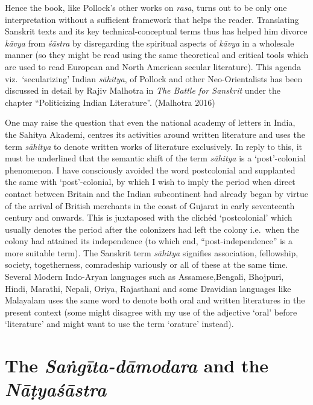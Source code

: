 Hence the book, like Pollock’s other works on \textsl{rasa}, turns out to be only one interpretation without a sufficient framework that helps the reader. Translating Sanskrit texts and its key technical-conceptual terms thus has helped him divorce \textsl{kāvya} from \textsl{śāstra} by disregarding the spiritual aspects of \textsl{kāvya} in a wholesale manner (so they might be read using the same theoretical and critical tools which are used to read European and North American secular literature). This agenda viz.~‘secularizing’ Indian \textsl{sāhitya}, of Pollock and other Neo-Orientalists has been discussed in detail by Rajiv Malhotra in \textsl{The Battle for Sanskrit} under the chapter “Politicizing Indian Literature”. (Malhotra 2016) 

One may raise the question that even the national academy of letters in India, the Sahitya Akademi, centres its activities around written literature and uses the term \textsl{sāhitya} to denote written works of literature exclusively. In reply to this, it must be underlined that the semantic shift of the term \textsl{sāhitya} is a ‘post’-colonial phenomenon. I have consciously avoided the word postcolonial and supplanted the same with ‘post’-colonial, by which I wish to imply the period when direct contact between Britain and the Indian subcontinent had already began by virtue of the arrival of British merchants in the coast of Gujarat in early seventeenth century and onwards. This is juxtaposed with the clichéd ‘postcolonial’ which usually denotes the period after the colonizers had left the colony i.e.~when the colony had attained its independence (to which end, ``post-independence'' is a more suitable term). The Sanskrit term \textsl{sāhitya} signifies association, fellowship, society, togetherness, comradeship variously or all of these at the same time. Several Modern Indo-Aryan languages such as Assamese,\break Bengali, Bhojpuri, Hindi, Marathi, Nepali, Oriya, Rajasthani and some Dravidian languages like Malayalam uses the same word to denote both oral and written literatures in the present context (some might disagree with my use of the adjective ‘oral’ before ‘literature’ and might want to use the term ‘orature’ instead).\\[-21pt]

\section*{The \textsl{Saṅgīta-dāmodara} and the \textsl{Nāṭyaśāstra}}

